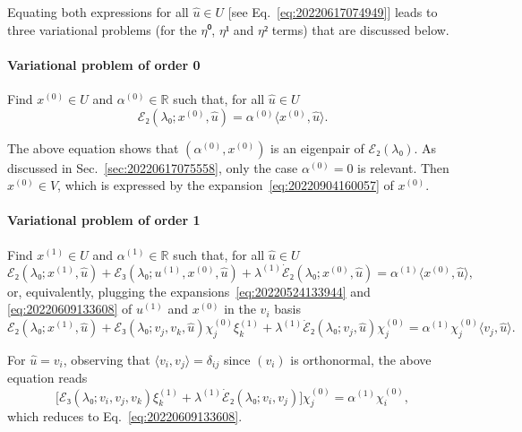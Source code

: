\documentclass[12pt, final]{scrartcl}
\theoremstyle{definition}
\newcommand{\E}{\mathcal E}
\newcommand{\order}[2][1]{#2^{(#1)}}
\newcommand{\reals}{\mathbb{R}}
\begin{document}
Equating both expressions for all $\hat{u} ∈ U$ [see
Eq.~\eqref{eq:20220617074949}] leads to three variational problems (for the
$η⁰$, $η¹$ and $η²$ terms) that are discussed below.

\paragraph{Variational problem of order 0} Find $\order[0]x∈U$ and $\order[0]α∈\reals$ such
that, for all $\hat{u}∈U$
\begin{equation*}
  \E₂(\lambda₀; \order[0]x, \hat{u}) = \order[0]α 〈 \order[0]x, \hat{u} 〉.
\end{equation*}

The above equation shows that $(\order[0]α, \order[0]x)$ is an eigenpair of $\E₂(\lambda₀)$. As
discussed in Sec.~\ref{sec:20220617075558}, only the case $\order[0]α = 0$ is
relevant. Then $\order[0]x ∈ V$, which is expressed by the
expansion~\eqref{eq:20220904160057} of $\order[0]x$.

\paragraph{Variational problem of order 1} Find $\order[1]x∈U$ and $\order[1]α∈\reals$ such
that, for all $\hat{u}∈U$
\begin{equation}
  \label{eq:20220609131953}
  \E₂(\lambda₀; \order[1]x, \hat{u}) + \E₃(\lambda₀; \order[1]u, \order[0]x, \hat{u}) + \order[1]\lambda \dot{\E}₂(\lambda₀; \order[0]x, \hat{u})
  = \order[1]α 〈 \order[0]x, \hat{u} 〉,
\end{equation}
or, equivalently, plugging the expansions~\eqref{eq:20220524133944} and
\eqref{eq:20220609133608} of $\order[1]u$ and $\order[0]x$ in the $v_i$ basis
\begin{equation}
  \label{eq:20220617080547}
  \E₂(\lambda₀; \order[1]x, \hat{u}) + \E₃(\lambda₀; v_j, v_k, \hat{u}) \order[0]{χ_j} \order[1]{ξ_k} + \order[1]\lambda \dot{\E}₂(\lambda₀; v_j, \hat{u}) \order[0]{χ_j}
  = \order[1]α \order[0]{χ_j} 〈 v_j, \hat{u} 〉.
\end{equation}

For $\hat{u} = v_i$, observing that $〈 v_i, v_j 〉 = δ_{ij}$ since
$(v_i)$ is orthonormal, the above equation reads
\begin{equation}
  \bigl[\E₃(\lambda₀; v_i, v_j, v_k) \order[1]{ξ_k} + \order[1]\lambda \dot{\E}₂(\lambda₀; v_i, v_j)\bigr] \order[0]{χ_j} = \order[1]α \order[0]{χ_i},
\end{equation}
which reduces to Eq.~\eqref{eq:20220609133608}.
\end{document}

